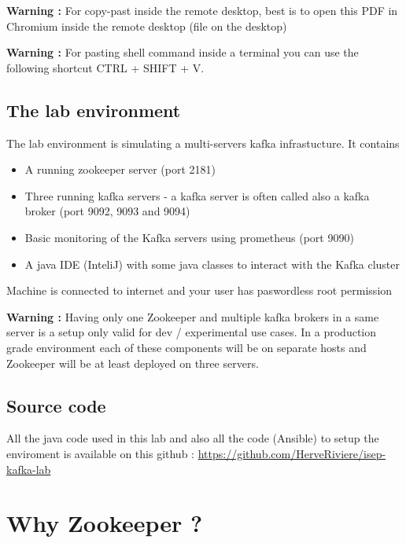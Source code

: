 \documentclass{article}
\newenvironment{warning}
    { \begin{mdframed}[backgroundcolor=blue!20] \textbf{Warning : } }
    {  \end{mdframed}}
\begin{document}
\begin{warning}
For copy-past inside the remote desktop, best is to open this PDF in Chromium inside the remote desktop (file on the desktop)
\end{warning}

\begin{warning}
For pasting shell command inside a terminal you can use the following shortcut CTRL + SHIFT + V.
\end{warning}

\subsection{The lab environment}

The lab environment is simulating a multi-servers kafka infrastucture. It contains 
\begin{itemize}
\item A running zookeeper server (port 2181)
\item Three running kafka servers - a kafka server is often called also a kafka broker  (port 9092, 9093 and 9094)
\item Basic monitoring of the Kafka servers using prometheus (port 9090) 
\item A java IDE (InteliJ) with some java classes to interact with the Kafka cluster
\end{itemize}

Machine is connected to internet and your user has paswordless root permission

\begin{warning}
Having only one Zookeeper and multiple kafka brokers in a same server is a setup only valid for dev / experimental use cases. In a production grade environment each of these components will be on separate hosts and Zookeeper will be at least deployed on three servers.
\end{warning}

\subsection{Source code}
All the java code used in this lab and also all the code (Ansible) to setup the enviroment is available on this github : \href{https://github.com/HerveRiviere/isep-kafka-lab}{https://github.com/HerveRiviere/isep-kafka-lab}

\section{Why Zookeeper ?}
\end{document}
